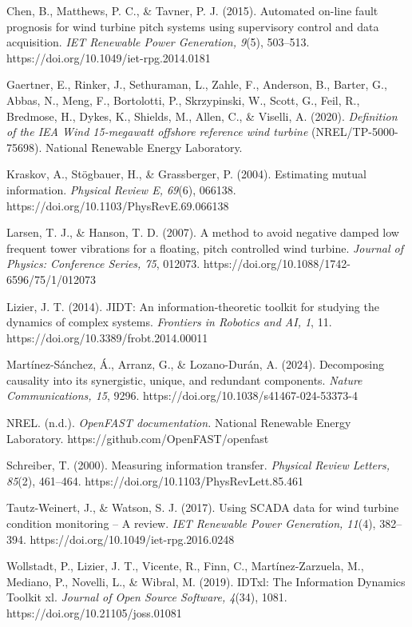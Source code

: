 \documentclass[
  english,
  11pt,
]{article}
\begin{document}
Chen, B., Matthews, P. C., \& Tavner, P. J. (2015). Automated on-line
fault prognosis for wind turbine pitch systems using supervisory control
and data acquisition. \emph{IET Renewable Power Generation, 9}(5),
503--513. https://doi.org/10.1049/iet-rpg.2014.0181

Gaertner, E., Rinker, J., Sethuraman, L., Zahle, F., Anderson, B.,
Barter, G., Abbas, N., Meng, F., Bortolotti, P., Skrzypinski, W., Scott,
G., Feil, R., Bredmose, H., Dykes, K., Shields, M., Allen, C., \&
Viselli, A. (2020). \emph{Definition of the IEA Wind 15-megawatt
offshore reference wind turbine} (NREL/TP-5000-75698). National
Renewable Energy Laboratory.

Kraskov, A., Stögbauer, H., \& Grassberger, P. (2004). Estimating mutual
information. \emph{Physical Review E, 69}(6), 066138.
https://doi.org/10.1103/PhysRevE.69.066138

Larsen, T. J., \& Hanson, T. D. (2007). A method to avoid negative
damped low frequent tower vibrations for a floating, pitch controlled
wind turbine. \emph{Journal of Physics: Conference Series, 75}, 012073.
https://doi.org/10.1088/1742-6596/75/1/012073

Lizier, J. T. (2014). JIDT: An information-theoretic toolkit for
studying the dynamics of complex systems. \emph{Frontiers in Robotics
and AI, 1}, 11. https://doi.org/10.3389/frobt.2014.00011

Martínez-Sánchez, Á., Arranz, G., \& Lozano-Durán, A. (2024).
Decomposing causality into its synergistic, unique, and redundant
components. \emph{Nature Communications, 15}, 9296.
https://doi.org/10.1038/s41467-024-53373-4

NREL. (n.d.). \emph{OpenFAST documentation.} National Renewable Energy
Laboratory. https://github.com/OpenFAST/openfast

Schreiber, T. (2000). Measuring information transfer. \emph{Physical
Review Letters, 85}(2), 461--464.
https://doi.org/10.1103/PhysRevLett.85.461

Tautz-Weinert, J., \& Watson, S. J. (2017). Using SCADA data for wind
turbine condition monitoring -- A review. \emph{IET Renewable Power
Generation, 11}(4), 382--394. https://doi.org/10.1049/iet-rpg.2016.0248

Wollstadt, P., Lizier, J. T., Vicente, R., Finn, C., Martínez-Zarzuela,
M., Mediano, P., Novelli, L., \& Wibral, M. (2019). IDTxl: The
Information Dynamics Toolkit xl. \emph{Journal of Open Source Software,
4}(34), 1081. https://doi.org/10.21105/joss.01081
\end{document}
